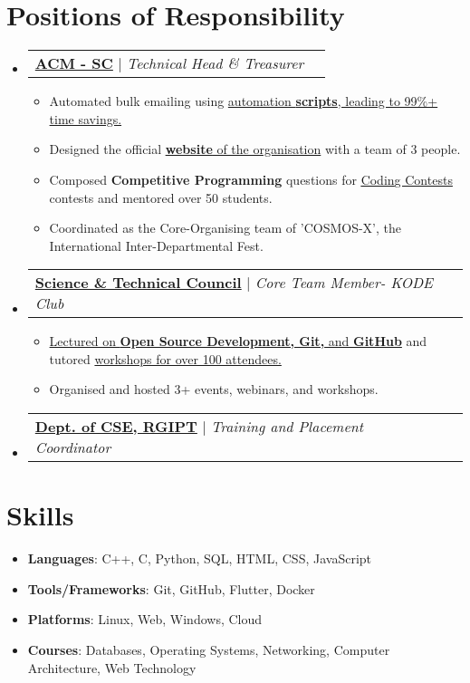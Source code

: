 \documentclass[letterpaper,10.5pt]{article}
\makeatletter
\newcommand{\resumeItem}[2]{
  \item\small{
    \textbf{#1}{: #2 \vspace{-2pt}}
  }
}
\newcommand{\resumeItemWithoutTitle}[1]{
  \item\small{
  {#1 \vspace{-2pt}}
    {\vspace{-2pt}}
  }
}
\newcommand{\resumeSubheadingPro}[2]{
  \vspace{-1pt}\item
    \begin{tabular*}{0.97\textwidth}{l@{\extracolsep{\fill}}r}
      #1 & {\textit {\small{#2}}} \\
    \end{tabular*}\vspace{-5pt}
}
\newcommand{\resumeSubItem}[2]{\resumeItem{#1}{#2}\vspace{-4pt}}
\newcommand{\resumeSubHeadingListStart}{\begin{itemize}[leftmargin=*]}
\newcommand{\resumeSubHeadingListEnd}{\end{itemize}}
\newcommand{\resumeItemListStart}{\begin{itemize}}
\newcommand{\resumeItemListEnd}{\end{itemize}\vspace{-5pt}}
\makeatother
\begin{document}
\section{Positions of Responsibility}



  \resumeSubHeadingListStart
      \resumeSubheadingPro
          {\href{https://rgipt.acm.org/}{{\textbf{ACM - SC}}} $|$ \emph{{Technical Head \&  Treasurer}} }{}
     \resumeItemListStart
   
        \resumeItemWithoutTitle
          {Automated bulk emailing using \href{https://github.com/AyushR1/Bulk-Certificate-Maker/}{automation \textbf{scripts}, leading to 99\%+ time savings.}}
        \resumeItemWithoutTitle
          {Designed the official \href{https://rgipt.acm.org/}{\underline{{\textbf{website}}} of the organisation} with a team of 3 people.}
    
     \resumeItemWithoutTitle
      {Composed \textbf{Competitive Programming} questions for \href{https://www.codechef.com/ODE2021/}{\underline{Codin}g Contests} contests and mentored over 50 students.}
     \resumeItemWithoutTitle
       {Coordinated as the Core-Organising team of 'COSMOS-X', the International Inter-Departmental Fest.}
    
      \resumeItemListEnd
      
  \resumeSubheadingPro
    { \href{https://www.rgipt.ac.in/en/page/home-cse}{{\textbf{Science \& Technical Council}}} $|$ \emph{Core Team Member- KODE Club} }{}
        \resumeItemListStart
          \resumeItemWithoutTitle     
                 {\href{https://photos.app.goo.gl/C3RExPgdJpwppjnm9}{Lectured on \textbf{Open Source Development, Git,} and \textbf{GitHub}} and tutored \href{ https://github.com/AyushR1/Git-GitHub-Workshop/}{{workshops for over 100 attendees.}} }     
                  \resumeItemWithoutTitle
      {Organised and hosted 3+ events, webinars, and workshops.}
     \resumeItemListEnd
     \resumeSubheadingPro
    { \href{https://www.rgipt.ac.in/en/page/home-cse}{{\textbf{Dept. of CSE, RGIPT}}} $|$ \emph{Training and Placement Coordinator} }{}
       
\resumeSubHeadingListEnd
%
\section{Skills}
	\resumeSubHeadingListStart
	\resumeSubItem{Languages}{C++, C, Python, SQL, HTML, CSS, JavaScript}
        	\resumeSubItem{Tools/Frameworks}{Git, GitHub, Flutter, Docker}
    \resumeSubItem{Platforms}{Linux, Web, Windows, Cloud}
        	\resumeSubItem{Courses}{Databases, Operating Systems, Networking, Computer Architecture, Web Technology}
\resumeSubHeadingListEnd
\end{document}
